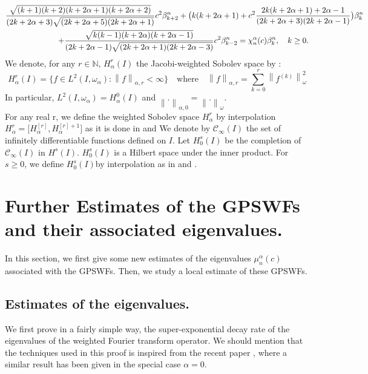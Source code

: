 \documentclass[]{article}
\newcommand{\N}{\mathbb N}
\newcounter{rea}
\newcommand{\norm}[1]{{\left\|{#1}\right\|}}
\begin{document}
\begin{eqnarray}\label{eigensystem}
\lefteqn{\frac{\sqrt{(k+1)(k+2)(k+2\alpha+1)(k+2\alpha+2)}}{(2k+2\alpha+3)\sqrt{(2k+2\alpha+5)(2k+2\alpha +1)}} c^2 \beta_{k+2}^n
	+ \big( k(k+2\alpha+1)+c^2 \frac{2k(k+2\alpha+1)+2\alpha-1}{(2k+2\alpha+3)(2k+2\alpha-1)} \big)
	\beta_k^n}\nonumber  \\
&&\hspace*{2cm} + \frac{\sqrt{k(k-1)(k+2\alpha)(k+2\alpha-1)}}{(2k+2\alpha-1)\sqrt{(2k+2\alpha+1)(2k+2\alpha-3)}} c^2
\beta_{k-2}^n= \chi_n^{\alpha}(c) \beta_k^n, \quad k\geq 0.
\end{eqnarray}
We denote, for any $ r \in \N $, $H^r_{\alpha}(I)$ the Jacobi-weighted Sobolev space by :
$$  H^r_{\alpha}(I) = \{f \in L^2(I,\omega_{\alpha}) : \norm{f}_{\alpha,r}<\infty \} \quad
\mbox{where} \quad \norm{f}_{\alpha,r} = \displaystyle{\sum_{k=0}^r \norm{f^{(k)}}_{\omega}^2} $$
In particular, $ L^2(I,\omega_{\alpha}) = H^0_{\alpha}(I) $ and $ \norm{.}_{\alpha,0} = \norm{.}_{\omega} $. \\
For any real r, we define the weighted Sobolev space $H^r_{\alpha}$ by interpolation  $ H^r_{\alpha} = \Big[H^{[r]}_{\alpha},H^{[r]+1}_{\alpha}\Big]$ as it is done in \cite{Bergh-Lofstrom} and \cite{Bernardi-Maday}
We denote by $ \mathcal{C}_{\infty}(I) $ the set of infinitely differentiable functions defined on $ I $.
Let $H_0^s(I) $ be the completion of $ \mathcal{C}_{\infty}(I) $ in $H^s(I)$. $H_0^s(I) $ is a Hilbert space under the inner product. For $s\geq 0$, we define $H_0^s(I) $by interpolation as in \cite{Bergh-Lofstrom} and \cite{Bernardi-Maday}. \\



\section{Further Estimates of the GPSWFs and their associated eigenvalues.}

In this section, we first give some new estimates of the eigenvalues $\mu_n^\alpha(c)$  associated with the
GPSWFs. Then, we study a local estimate of these GPSWFs.


\subsection{Estimates  of the eigenvalues.}

We first prove in a fairly simple way, the  super-exponential decay rate of the eigenvalues of the weighted Fourier transform operator.
We should mention that  the techniques used in this  proof is inspired from the recent paper \cite{Bonami-jamming-Karoui},
 where a similar result has been given in the special case $ \alpha = 0$.
\end{document}
